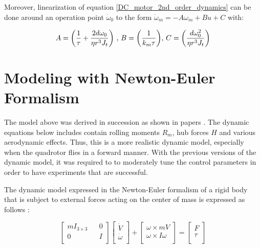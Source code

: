 \documentclass{thesisreport}
\begin{document}
Moreover, linearization of equation \ref{DC_motor_2nd_order_dynamics} can be done around an operation point $\dot{\omega}_0$ to the form $\dot{\omega}_m = -A \omega_m + B u + C$ with: 

\begin{equation}
A = \bigg( \frac{1}{\tau}+\frac{2d\omega_0}{\eta r^3 J_t} \bigg) \text{ \hfill , \hfill} B = \bigg( \frac{1}{k_m \tau} \bigg) \text{\hfill , \hfill} C = \bigg( \frac{d \omega_0^2}{\eta r^3 J_t} \bigg)
\end{equation}
 
 
 \section{Modeling with Newton-Euler Formalism}
 
The model above was derived in succession as shown in papers  \cite{Bouabdallah2004,Bouabdallah2005a,Bouabdallah2005b} . The dynamic equations below includes contain rolling moments $R_m$, hub forces $H$ and various aerodynamic effects.
Thus, this is a more realistic dynamic model, especially when the quadrotor flies in a forward manner. 
With the previous versions of the dynamic model, it was required to to moderately tune the control parameters in order to have experiments that are successful.

The dynamic model expressed in the Newton-Euler formalism of a rigid body that is subject to external forces acting on the center of mass is expressed as follows \cite{Murray1994}:

\begin{equation}\label{NE_Formalism}
\begin{bmatrix}
m I_{3 \times 3} && 0 \\
0 && I \\
\end{bmatrix}
\begin{bmatrix}
\dot{V}\\
\dot{\omega}\\
\end{bmatrix}
+ \begin{bmatrix}
\omega \times mV \\
\omega \times I \omega \\
\end{bmatrix}
=
\begin{bmatrix}
F \\
\tau \\
\end{bmatrix}
\end{equation}
 
\end{document}
